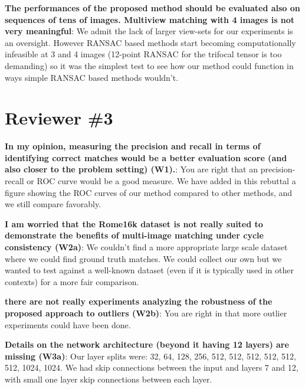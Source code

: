 \documentclass[10pt,twocolumn,letterpaper]{article}
\begin{document}
\textbf{The performances of the proposed method should be evaluated also on sequences of tens of images. Multiview matching with 4 images is not very meaningful}: 
We admit the lack of larger view-sets for our experiments is an oversight. However RANSAC based methods start becoming computationally infeasible at 3 and 4 images (12-point RANSAC for the trifocal tensor is too demanding) so it was the simplest test to see how our method could function in ways simple RANSAC based methods wouldn't.



\section{Reviewer \#3}
\textbf{ In my opinion, measuring the precision and recall in terms of identifying correct matches would be a better evaluation score (and also closer to the problem setting) (W1).}:
You are right that an precision-recall or ROC curve would be a good measure. We have added in this rebuttal a figure showing the ROC curves of our method compared to other methods, and we still compare favorably.

\textbf{I am worried that the Rome16k dataset is not really suited to demonstrate the benefits of multi-image matching under cycle consistency (W2a)}:
We couldn't find a more appropriate large scale dataset where we could find ground truth matches. We could collect our own but we wanted to test against a well-known dataset (even if it is typically used in other contexts) for a more fair comparison.

\textbf{there are not really experiments analyzing the robustness of the proposed approach to outliers (W2b)}:
You are right in that more outlier experiments could have been done. 

\textbf{Details on the network architecture (beyond it having 12 layers) are missing (W3a)}:
Our layer splits were: 32, 64, 128, 256, 512, 512, 512, 512, 512, 512, 1024, 1024. We had skip connections between the input and layers 7 and 12, with small one layer skip connections between each layer. 
\end{document}
